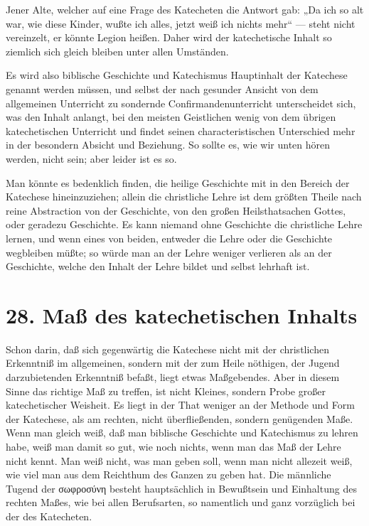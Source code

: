 Jener Alte, welcher auf eine Frage des Katecheten die Antwort gab: „Da ich so alt war, wie diese Kinder, wußte ich alles, jetzt weiß ich nichts mehr“ — steht nicht vereinzelt, er könnte Legion heißen. Daher wird der katechetische Inhalt so ziemlich sich gleich bleiben unter allen Umständen.

Es wird also biblische Geschichte und Katechismus Hauptinhalt der Katechese genannt werden müssen, und selbst der nach gesunder Ansicht von dem allgemeinen Unterricht zu sondernde Confirmandenunterricht unterscheidet sich, was den Inhalt anlangt, bei den meisten Geistlichen wenig von dem übrigen katechetischen Unterricht und findet seinen characteristischen Unterschied mehr in der besondern Absicht und Beziehung. So sollte es, wie wir unten hören werden, nicht sein; aber leider ist es so.

Man könnte es bedenklich finden, die heilige Geschichte mit in den Bereich der Katechese hineinzuziehen; allein die christliche Lehre ist dem größten Theile nach reine Abstraction von der Geschichte, von den großen Heilsthatsachen Gottes, oder geradezu Geschichte. Es kann niemand ohne Geschichte die christliche Lehre lernen, und wenn eines von beiden, entweder die Lehre oder die Geschichte wegbleiben müßte; so würde man an der Lehre weniger verlieren als an der Geschichte, welche den Inhalt der Lehre bildet und selbst lehrhaft ist.

\section{28. Maß des katechetischen Inhalts}

Schon darin, daß sich gegenwärtig die Katechese nicht mit der christlichen Erkenntniß im allgemeinen, sondern mit der zum Heile nöthigen, der Jugend darzubietenden Erkenntniß befaßt, liegt etwas Maßgebendes. Aber in diesem Sinne das richtige Maß zu treffen, ist nicht Kleines, sondern Probe großer katechetischer Weisheit. Es liegt in der That weniger an der Methode und Form der Katechese, als am rechten, nicht überfließenden, sondern genügenden Maße. Wenn man gleich weiß, daß man biblische Geschichte und Katechismus zu lehren habe, weiß man damit so gut, wie noch nichts, wenn man das Maß der Lehre nicht kennt. Man weiß nicht, was man geben soll, wenn man nicht allezeit weiß, wie viel man aus dem Reichthum des Ganzen zu geben hat. Die männliche Tugend der σωφροσύνη besteht hauptsächlich in Bewußtsein und Einhaltung des rechten Maßes, wie bei allen Berufsarten, so namentlich und ganz vorzüglich bei der des Katecheten.

